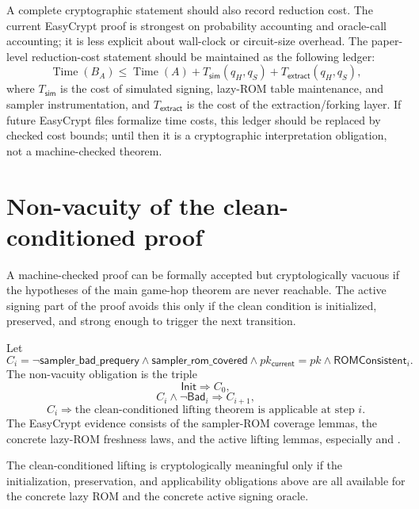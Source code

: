 A complete cryptographic statement should also record reduction cost.  The
current EasyCrypt proof is strongest on probability accounting and oracle-call
accounting; it is less explicit about wall-clock or circuit-size overhead.  The
paper-level reduction-cost statement should be maintained as the following
ledger:
\[
  \operatorname{Time}(B_A)
  \le
  \operatorname{Time}(A)
  + T_{\mathsf{sim}}(q_H,q_S)
  + T_{\mathsf{extract}}(q_H,q_S),
\]
where \(T_{\mathsf{sim}}\) is the cost of simulated signing, lazy-ROM table
maintenance, and sampler instrumentation, and \(T_{\mathsf{extract}}\) is the
cost of the extraction/forking layer.  If future EasyCrypt files formalize time
costs, this ledger should be replaced by checked cost bounds; until then it is a
cryptographic interpretation obligation, not a machine-checked theorem.

\section{Non-vacuity of the clean-conditioned proof}
\label{sec:synthesis-non-vacuity-rewritten}

A machine-checked proof can be formally accepted but cryptologically vacuous if
the hypotheses of the main game-hop theorem are never reachable.  The active
signing part of the \haetae{} proof avoids this only if the clean condition is
initialized, preserved, and strong enough to trigger the next transition.

Let
\[
  C_i =
  \neg\mathsf{sampler\_bad\_prequery}
  \wedge
  \mathsf{sampler\_rom\_covered}
  \wedge
  pk_{\mathsf{current}}=pk
  \wedge
  \mathsf{ROMConsistent}_i.
\]
The non-vacuity obligation is the triple
\[
  \mathsf{Init}\Rightarrow C_0,
\]
\[
  C_i\wedge\neg\mathsf{Bad}_i\Rightarrow C_{i+1},
\]
\[
  C_i\Rightarrow
  \text{the clean-conditioned lifting theorem is applicable at step }i.
\]
The EasyCrypt evidence consists of the sampler-ROM coverage lemmas, the concrete
lazy-ROM freshness laws, and the active  lifting lemmas, especially
and
.

\begin{lemma}
\label{lem:paper-level-non-vacuity}
The clean-conditioned lifting is cryptologically meaningful only if the
initialization, preservation, and applicability obligations above are all
available for the concrete \haetae{} lazy ROM and the concrete active signing
oracle.
\end{lemma}

